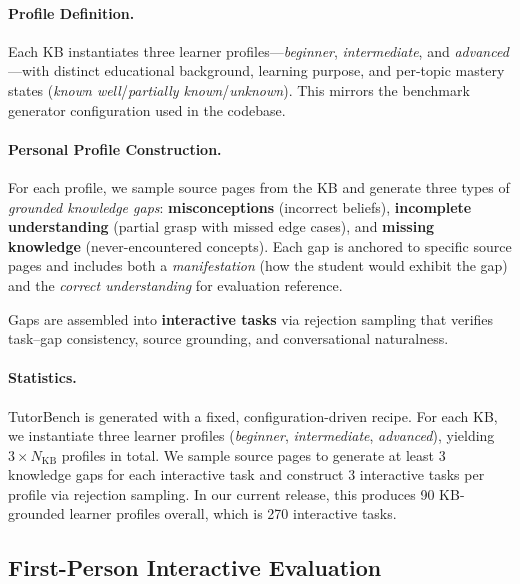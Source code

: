 \paragraph{Profile Definition.}
Each KB instantiates three learner profiles---\textit{beginner}, \textit{intermediate}, and \textit{advanced}---with distinct educational background, learning purpose, and per-topic mastery states (\textit{known well}/\textit{partially known}/\textit{unknown}).
This mirrors the benchmark generator configuration used in the codebase.
  
\paragraph{Personal Profile Construction.}
For each profile, we sample source pages from the KB and generate three types of \emph{grounded knowledge gaps}:
  \textbf{misconceptions} (incorrect beliefs),
  \textbf{incomplete understanding} (partial grasp with missed edge cases), and
  \textbf{missing knowledge} (never-encountered concepts).
  Each gap is anchored to specific source pages and includes both a \textit{manifestation} (how the student would exhibit the gap) and the \textit{correct understanding} for evaluation reference.
  
Gaps are assembled into \textbf{interactive tasks} via rejection sampling that verifies task--gap consistency, source grounding, and conversational naturalness.
  
\paragraph{Statistics.}
TutorBench is generated with a fixed, configuration-driven recipe.
For each KB, we instantiate three learner profiles (\textit{beginner},
\textit{intermediate}, \textit{advanced}), yielding $3 \times N_{\text{KB}}$
profiles in total. We sample source pages to generate at least 3 knowledge gaps for each interactive task and construct 3
interactive tasks per profile via rejection sampling. In our current release, this produces 90 KB-grounded learner
profiles overall, which is 270 interactive tasks.
  
  
  \subsection{First-Person Interactive Evaluation}
  \label{sec:interactive_eval}
  
